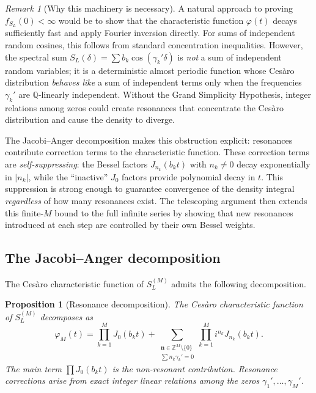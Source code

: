 \documentclass[12pt,reqno]{amsart}
\theoremstyle{plain}
\newtheorem{proposition}[theorem]{Proposition}
\theoremstyle{definition}
\theoremstyle{remark}
\newtheorem{remark}[theorem]{Remark}
\newcommand{\Q}{\mathbb{Q}}
\newcommand{\Z}{\mathbb{Z}}
\begin{document}
\begin{remark}[Why this machinery is necessary]
A natural approach to proving $f_{S_L}(0) < \infty$ would be to show that the characteristic function $\varphi(t)$ decays sufficiently fast and apply Fourier inversion directly.  For sums of independent random cosines, this follows from standard concentration inequalities.  However, the spectral sum $S_L(\delta) = \sum b_k \cos(\gamma_k' \delta)$ is \emph{not} a sum of independent random variables; it is a deterministic almost periodic function whose Ces\`aro distribution \emph{behaves like} a sum of independent terms only when the frequencies $\gamma_k'$ are $\Q$-linearly independent.  Without the Grand Simplicity Hypothesis, integer relations among zeros could create resonances that concentrate the Ces\`aro distribution and cause the density to diverge.

The Jacobi--Anger decomposition makes this obstruction explicit: resonances contribute correction terms to the characteristic function.  These correction terms are \emph{self-suppressing}: the Bessel factors $J_{n_k}(b_k t)$ with $n_k \neq 0$ decay exponentially in $|n_k|$, while the ``inactive'' $J_0$ factors provide polynomial decay in $t$.  This suppression is strong enough to guarantee convergence of the density integral \emph{regardless} of how many resonances exist.  The telescoping argument then extends this finite-$M$ bound to the full infinite series by showing that new resonances introduced at each step are controlled by their own Bessel weights.
\end{remark}


\subsection{The Jacobi--Anger decomposition}

The Ces\`aro characteristic function of $S_L^{(M)}$ admits the following decomposition.

\begin{proposition}[Resonance decomposition]\label{prop:resonance}
The Ces\`aro characteristic function of $S_L^{(M)}$ decomposes as
\[
  \varphi_M(t) = \prod_{k=1}^M J_0(b_k t) + \sum_{\substack{\mathbf{n}\in\Z^M\setminus\{0\}\\\sum n_k\gamma_k'=0}} \prod_{k=1}^M i^{n_k} J_{n_k}(b_k t).
\]
The main term $\prod J_0(b_k t)$ is the non-resonant contribution.  Resonance corrections arise from exact integer linear relations among the zeros $\gamma_1',\ldots,\gamma_M'$.
\end{proposition}
\end{document}
